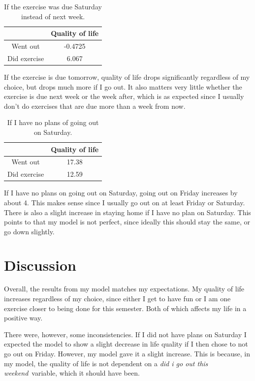 \documentclass{article}
\begin{document}
    \begin{table}[ht]
        \centering
        \begin{tabular}{| c | c |}\hline
            & Quality of life\\\hline
            Went out & -0.4725\\\hline
            Did exercise & 6.067\\\hline
        \end{tabular}
        \caption{If the exercise was due Saturday instead of next week.}
        \label{tab:tomorrow}
    \end{table}

    If the exercise is due tomorrow, quality of life drops significantly
    regardless of my choice, but drops much more if I go out. It also matters
    very little whether the exercise is due next week or the week after, which
    is as expected since I usually don't do exercises that are due more than a
    week from now.

    \begin{table}[ht]
        \centering
        \begin{tabular}{| c | c |}\hline
            & Quality of life\\\hline
            Went out & 17.38\\\hline
            Did exercise & 12.59\\\hline
        \end{tabular}
        \caption{If I have no plans of going out on Saturday.}
        \label{tab:saturday}
    \end{table}

    If I have no plans on going out on Saturday, going out on Friday increases
    by about 4. This makes sense since I usually go out on at least Friday or
    Saturday. There is also a slight increase in staying home if I have no plan
    on Saturday. This points to that my model is not perfect, since ideally
    this should stay the same, or go down slightly.

\section*{Discussion}
    Overall, the results from my model matches my expectations. My quality of
    life increases regardless of my choice, since either I get to have fun or I
    am one exercise closer to being done for this semester. Both of which
    affects my life in a positive way. 

    There were, however, some inconsistencies. If I did not have plans on
    Saturday I expected the model to show a slight decrease in life quality if
    I then chose to not go out on Friday. However, my model gave it a slight
    increase. This is because, in my model, the quality of life is not
    dependent on a \emph{did i go out this weekend} variable, which it should
    have been.




\end{document}
